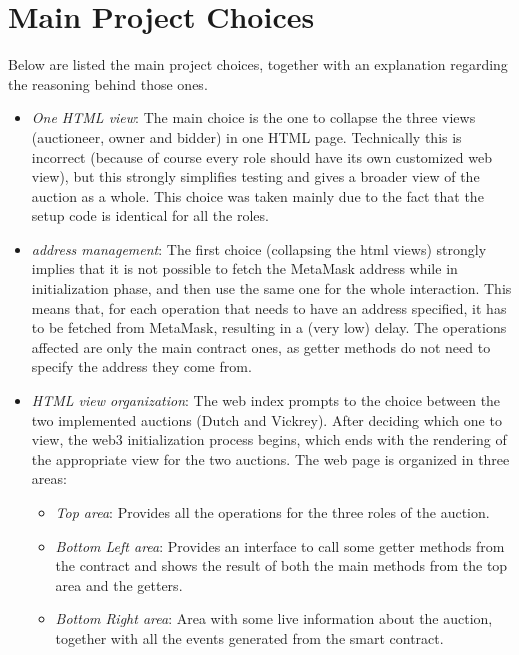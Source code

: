 \documentclass[11pt, a4paper]{report}
\begin{document}
\section*{Main Project Choices}
Below are listed the main project choices, together with an explanation regarding the reasoning behind those ones.
\begin{itemize}
	\item \emph{One HTML view}: The main choice is the one to collapse the three views (auctioneer, owner and bidder) in one HTML page. Technically this is incorrect (because of course every role should have its own customized web view), but this strongly simplifies testing and gives a broader view of the auction as a whole. This choice was taken mainly due to the fact that the setup code is identical for all the roles.
	\item \emph{address management}: The first choice (collapsing the html views) strongly implies that it is not possible to fetch the MetaMask address while in initialization phase, and then use the same one for the whole interaction. This means that, for each operation that needs to have an address specified, it has to be fetched from MetaMask, resulting in a (very low) delay. The operations affected are only the main contract ones, as getter methods do not need to specify the address they come from. 
	\item \emph{HTML view organization}: The web index prompts to the choice between the two implemented auctions (Dutch and Vickrey). After deciding which one to view, the web3 initialization process begins, which ends with the rendering of the appropriate view for the two auctions. The web page is organized in three areas:
	\begin{itemize}
		\item \emph{Top area}: Provides all the operations for the three roles of the auction.
		\item \emph{Bottom Left area}: Provides an interface to call some getter methods from the contract and shows the result of both the main methods from the top area and the getters.
		\item \emph{Bottom Right area}: Area with some live information about the auction, together with all the events generated from the smart contract.
	\end{itemize}
\end{itemize}
	
\end{document}
